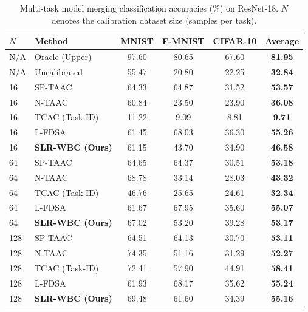 \documentclass{article}
\theoremstyle{plain}
\theoremstyle{definition}
\theoremstyle{remark}
\begin{document}
\begin{table}[h]
\caption{Multi-task model merging classification accuracies (\%) on ResNet-18. $N$ denotes the calibration dataset size (samples per task).}
\label{tab:results}
\vskip 0.15in
\begin{center}
\begin{scriptsize}
\begin{sc}
\setlength{\tabcolsep}{0.8pt}
\begin{tabular}{llcccc}
\toprule
$N$ & Method & MNIST & F-MNIST & CIFAR-10 & Average \\
\midrule
N/A & Oracle (Upper) & 97.60 & 80.65 & 67.60 & \textbf{81.95} \\
N/A & Uncalibrated & 55.47 & 20.80 & 22.25 & \textbf{32.84} \\
\midrule
16 & SP-TAAC & 64.33 & 64.87 & 31.52 & \textbf{53.57} \\
16 & N-TAAC & 60.84 & 23.50 & 23.90 & \textbf{36.08} \\
16 & TCAC (Task-ID) & 11.22 & 9.09 & 8.81 & \textbf{9.71} \\
16 & L-FDSA & 61.45 & 68.03 & 36.30 & \textbf{55.26} \\
16 & \textbf{SLR-WBC (Ours)} & 61.15 & 43.70 & 34.90 & \textbf{46.58} \\
\midrule
64 & SP-TAAC & 64.65 & 64.37 & 30.51 & \textbf{53.18} \\
64 & N-TAAC & 68.78 & 33.14 & 28.03 & \textbf{43.32} \\
64 & TCAC (Task-ID) & 46.76 & 25.65 & 24.61 & \textbf{32.34} \\
64 & L-FDSA & 61.67 & 67.95 & 35.60 & \textbf{55.07} \\
64 & \textbf{SLR-WBC (Ours)} & 67.02 & 53.20 & 39.28 & \textbf{53.17} \\
\midrule
128 & SP-TAAC & 64.51 & 64.13 & 30.70 & \textbf{53.11} \\
128 & N-TAAC & 74.35 & 51.16 & 31.29 & \textbf{52.27} \\
128 & TCAC (Task-ID) & 72.41 & 57.90 & 44.91 & \textbf{58.41} \\
128 & L-FDSA & 61.93 & 68.17 & 35.62 & \textbf{55.24} \\
128 & \textbf{SLR-WBC (Ours)} & 69.48 & 61.60 & 34.39 & \textbf{55.16} \\
\bottomrule
\end{tabular}
\end{sc}
\end{scriptsize}
\end{center}
\vskip -0.1in
\end{table}
\end{document}
